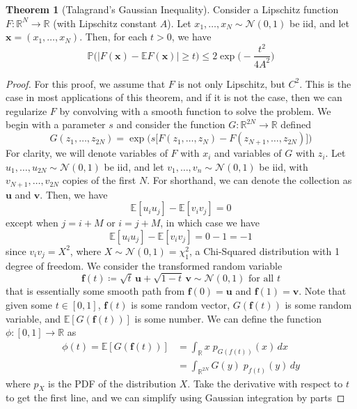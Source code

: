 \documentclass{article}
\theoremstyle{definition}
\newtheorem{theorem}{Theorem}[section]
\theoremstyle{remark}
\theoremstyle{definition}
\begin{document}
\begin{theorem}[Talagrand's Gaussian Inequality]
Consider a Lipschitz function $F: \mathbb{R}^N \longrightarrow \mathbb{R}$ (with Lipschitz constant $A$). Let $x_1, \ldots, x_N \sim \mathcal{N}(0, 1)$ be iid, and let $\mathbf{x} = (x_1, \ldots, x_N)$. Then, for each $t > 0$, we have 
\[\mathbb{P} \big( | F(\mathbf{x}) - \mathbb{E} F(\mathbf{x}) | \geq t \big) \leq 2 \exp \bigg(- \frac{t^2}{4A^2} \bigg)\]
\end{theorem}
\begin{proof}
For this proof, we assume that $F$ is not only Lipschitz, but $C^2$. This is the case in most applications of this theorem, and if it is not the case, then we can regularize $F$ by convolving with a smooth function to solve the problem. We begin with a parameter $s$ and consider the function $G: \mathbb{R}^{2N} \longrightarrow \mathbb{R}$ defined 
\[G(z_1, \ldots, z_{2N}) = \exp \Big( s \big[ F ( z_1, \ldots, z_N) - F(z_{N+1}, \ldots, z_{2N}) \big] \Big)\]
For clarity, we will denote variables of $F$ with $x_i$ and variables of $G$ with $z_i$. Let $u_1, \ldots, u_{2N} \sim \mathcal{N}(0, 1)$ be iid, and let $v_1, \ldots, v_n \sim \mathcal{N}(0, 1)$ be iid, with $v_{N+1}, \ldots, v_{2N}$ copies of the first $N$. For shorthand, we can denote the collection as $\mathbf{u}$ and $\mathbf{v}$. Then, we have 
\[\mathbb{E} [u_i u_j] - \mathbb{E}[ v_i v_j] = 0\]
except when $j = i + M$ or $i = j + M$, in which case we have 
\[\mathbb{E} [u_i u_j] - \mathbb{E}[ v_i v_j] = 0 - 1 = -1\]
since $v_i v_j = X^2$, where $X \sim \mathcal{N}(0, 1) = \chi^2_1$, a Chi-Squared distribution with 1 degree of freedom. We consider the transformed random variable
\[\mathbf{f}(t) \coloneqq \sqrt{t} \, \mathbf{u} + \sqrt{1 - t} \, \mathbf{v} \sim \mathcal{N}(0, 1) \text{ for all } t\]
that is essentially some smooth path from $\mathbf{f}(0) = \mathbf{u}$ and $\mathbf{f}(1) = \mathbf{v}$. Note that given some $t \in [0, 1]$, $\mathbf{f}(t)$ is some random vector, $G ( \mathbf{f}(t))$ is some random variable, and $\mathbb{E}[ G(\mathbf{f}(t))]$ is some number. We can define the function $\phi: [0, 1] \longrightarrow \mathbb{R}$ as 
\begin{align*}
    \phi(t) = \mathbb{E} [G (\mathbf{f}(t))] & = \int_\mathbb{R} x \; p_{G(f(t))} (x) \,dx \\
    & = \int_{\mathbb{R}^{2N}} G(y) \; p_{f(t)} (y) \,dy 
\end{align*}
where $p_X$ is the PDF of the distribution $X$. Take the derivative with respect to $t$ to get the first line, and we can simplify using Gaussian integration by parts 

\end{proof}
\end{document}
